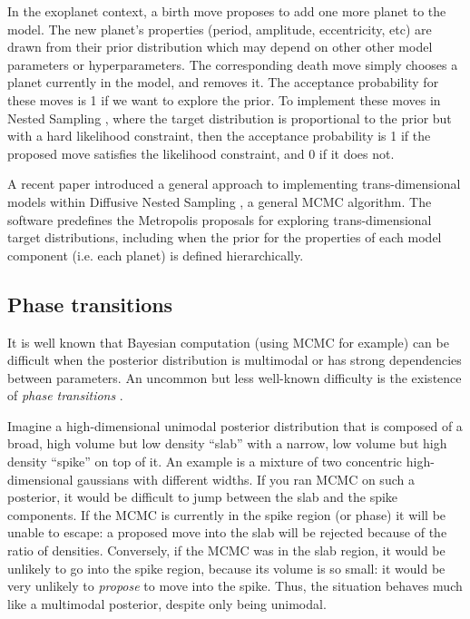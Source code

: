 \documentclass[useAMS,usenatbib]{mn2e}
\begin{document}
In the exoplanet context, a birth move
proposes to add one more planet to the model. The new planet's properties
(period, amplitude, eccentricity, etc) are drawn from their prior distribution
which may depend on other other model parameters or hyperparameters.
The corresponding death move simply chooses a planet currently in the model,
and removes it. The acceptance probability for these moves is 1 if we want
to explore the prior. To implement these moves in Nested Sampling
\citep{skilling}, where the target distribution is proportional to the prior but with a hard likelihood
constraint, then the acceptance probability is 1 if the proposed move
satisfies the likelihood constraint, and 0 if it does not.

A recent paper \citep{rjobject} introduced a general approach to implementing
trans-dimensional models within Diffusive Nested Sampling \citep{dnest}, a
general MCMC algorithm. The \citet{rjobject} software predefines the
Metropolis proposals for exploring trans-dimensional target distributions,
including when the prior for the properties of each model component (i.e. each
planet) is defined hierarchically.

\subsection{Phase transitions}
It is well known that Bayesian computation (using MCMC for example) can be
difficult when the posterior distribution is multimodal or has strong
dependencies between parameters. An uncommon but less well-known difficulty
is the existence of {\it phase transitions} \citep{skilling}.

Imagine a high-dimensional unimodal posterior distribution that is composed of a
broad, high volume but low density ``slab'' with a narrow, low volume but high
density ``spike'' on top of it.
An example is a mixture of two concentric high-dimensional gaussians with
different widths. If you ran MCMC on such a posterior, it would be difficult
to jump between the slab and the spike components. If the MCMC is currently
in the spike region (or phase) it will be unable to escape: a proposed move
into the slab will be rejected because of the ratio of densities. Conversely,
if the MCMC was in the slab region, it would be unlikely to go into the spike
region, because its volume is so small: it would be very unlikely to
{\it propose} to move into the spike. Thus, the situation behaves much like
a multimodal posterior, despite only being unimodal.
\end{document}

